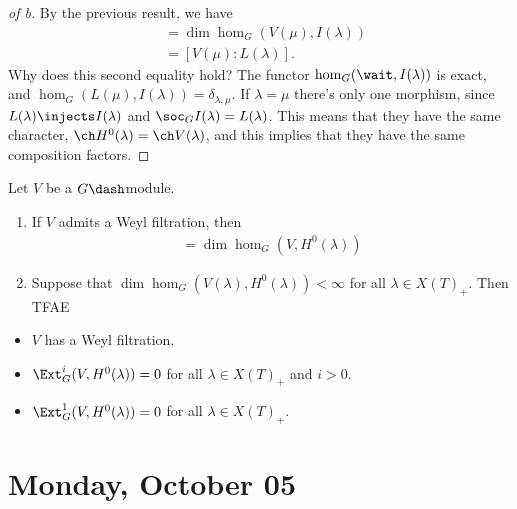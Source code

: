 \begin{proof}[of b]

By the previous result, we have
\begin{align*}  
[I(\lambda): H^0(\mu) ] 
&= \dim \hom_G(V(\mu), I(\lambda)) \\
&= [V(\mu): L(\lambda) ]
.\end{align*} Why does this second equality hold? The functor
\(\hom_G(\wait, I(\lambda))\) is exact, and
\(\hom_G(L(\mu), I(\lambda)) = \delta_{\lambda, \mu}\). If
\(\lambda = \mu\) there's only one morphism, since
\(L(\lambda) \injects I(\lambda)\) and
\(\soc_G I(\lambda) = L(\lambda)\). This means that they have the same
character, \(\ch H^0(\lambda) = \ch V(\lambda)\), and this implies that
they have the same composition factors.

\end{proof}

\begin{theorem}

Let \(V\) be a \(G\dash\)module.

\begin{enumerate}
\def\labelenumi{\alph{enumi}.}
\item
  If \(V\) admits a Weyl filtration, then
  \begin{align*}
  [V: V(\lambda)] = \dim \hom_G (V, H^0(\lambda))
  \end{align*}
\item
  Suppose that \(\dim \hom_G(V(\lambda), H^0(\lambda)) < \infty\) for
  all \(\lambda \in X(T)_+\). Then TFAE
\end{enumerate}

\begin{itemize}
\tightlist
\item
  \(V\) has a Weyl filtration.
\item
  \(\Ext^i_G(V, H^0(\lambda)) = 0\) for all \(\lambda \in X(T)_+\) and
  \(i>0\).
\item
  \(\Ext^1_G(V, H^0(\lambda)) = 0\) for all \(\lambda \in X(T)_+\).
\end{itemize}

\end{theorem}

\hypertarget{monday-october-05}{%
\section{Monday, October 05}\label{monday-october-05}}

